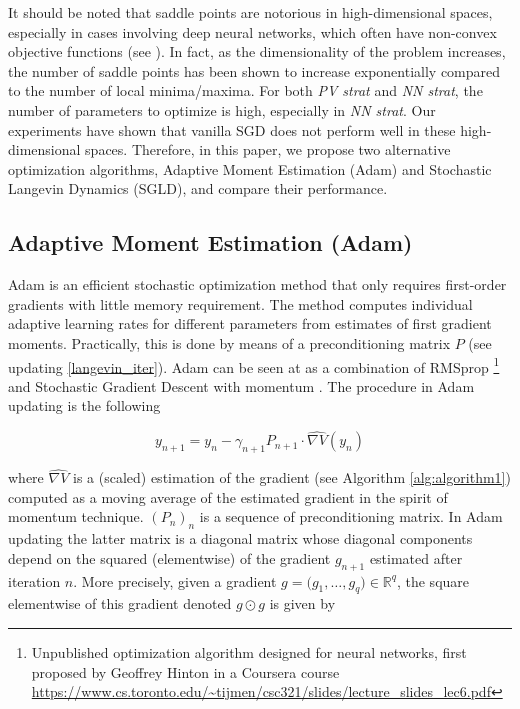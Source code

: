 \documentclass{article}
\numberwithin{equation}{section}
\begin{document}
\noindent
It should be noted that saddle points are notorious in high-dimensional spaces, especially in cases involving deep neural networks, which often have non-convex objective functions (see \cite{Dauphin2014IdentifyingAA, sgdSaddlePoints}). In fact, as the dimensionality of the problem increases, the number of saddle points has been shown to increase exponentially compared to the number of local minima/maxima. For both \textit{PV strat} and \textit{NN strat}, the number of parameters to optimize is high, especially in \textit{NN strat}. Our experiments have shown that vanilla SGD does not perform well in these high-dimensional spaces. Therefore, in this paper, we propose two alternative optimization algorithms, Adaptive Moment Estimation (Adam) and Stochastic Langevin Dynamics (SGLD), and compare their performance.

\subsection{Adaptive Moment Estimation (Adam)}

\indent

Adam \cite{Kingma2015AdamAM} is an efficient stochastic optimization method that only requires first-order gradients with little memory requirement. The method computes individual adaptive learning rates for
different parameters from estimates of first gradient moments. Practically, this is done by means of a preconditioning matrix $P$ (see updating \eqref{langevin_iter}). Adam can be seen at as a combination of RMSprop \footnote{Unpublished optimization algorithm designed for neural networks, first proposed by Geoffrey Hinton in a Coursera course \url{https://www.cs.toronto.edu/~tijmen/csc321/slides/lecture_slides_lec6.pdf}} and Stochastic Gradient Descent with momentum \cite{sgdMoment}. The procedure in Adam updating is the following

\begin{equation}
\label{langevin_iter}
y_{n+1} = y_n - \gamma_{n+1}P_{n+1} \cdot \widehat{\nabla V}(y_n)
\end{equation}

\noindent
where $\widehat{\nabla V}$ is a (scaled) estimation of the gradient (see Algorithm \ref{alg:algorithm1}) computed as a moving average of the estimated gradient in the spirit of momentum technique. $(P_{n})_n$ is a sequence of preconditioning matrix. In Adam updating the latter matrix is a diagonal matrix whose diagonal components depend on the squared (elementwise) of the gradient $g_{n+1}$ estimated after iteration $n$. More precisely, given a gradient $g = \big(g_1, \ldots, g_q \big) \in \mathbb{R}^q$, the square elementwise of this gradient denoted $g \odot g$ is given by
\end{document}
